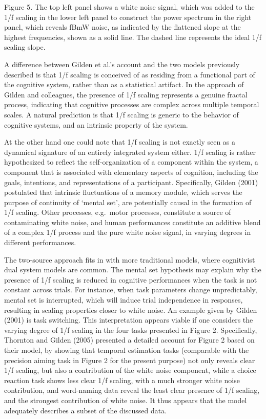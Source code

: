 \documentclass[12pt,]{book}
\begin{document}
Figure 5. The top left panel shows a white noise signal, which was added to the 1/f scaling in the lower left panel to construct the power spectrum in the right panel, which reveals fBmW noise, as indicated by the flattened slope at the highest frequencies, shown as a solid line. The dashed line represents the ideal 1/f scaling slope.

A difference between Gilden et al.'s account and the two models previously described is that 1/f scaling is conceived of as residing from a functional part of the cognitive system, rather than as a statistical artifact. In the approach of Gilden and colleagues, the presence of 1/f scaling represents a genuine fractal process, indicating that cognitive processes are complex across multiple temporal scales. A natural prediction is that 1/f scaling is generic to the behavior of cognitive systems, and an intrinsic property of the system.

At the other hand one could note that 1/f scaling is not exactly seen as a dynamical signature of an entirely integrated system either. 1/f scaling is rather hypothesized to reflect the self-organization of a component within the system, a component that is associated with elementary aspects of cognition, including the goals, intentions, and representations of a participant. Specifically, Gilden (2001) postulated that intrinsic fluctuations of a memory module, which serves the purpose of continuity of `mental set', are potentially causal in the formation of 1/f scaling. Other processes, e.g.~motor processes, constitute a source of contaminating white noise, and human performances constitute an additive blend of a complex 1/f process and the pure white noise signal, in varying degrees in different performances.

The two-source approach fits in with more traditional models, where cognitivist dual system models are common. The mental set hypothesis may explain why the presence of 1/f scaling is reduced in cognitive performances when the task is not constant across trials. For instance, when task parameters change unpredictably, mental set is interrupted, which will induce trial independence in responses, resulting in scaling properties closer to white noise. An example given by Gilden (2001) is task switching. This interpretation appears viable if one considers the varying degree of 1/f scaling in the four tasks presented in Figure 2. Specifically, Thornton and Gilden (2005) presented a detailed account for Figure 2 based on their model, by showing that temporal estimation tasks (comparable with the precision aiming task in Figure 2 for the present purpose) not only reveals clear 1/f scaling, but also a contribution of the white noise component, while a choice reaction task shows less clear 1/f scaling, with a much stronger white noise contribution, and word-naming data reveal the least clear presence of 1/f scaling, and the strongest contribution of white noise. It thus appears that the model adequately describes a subset of the discussed data.
\end{document}
